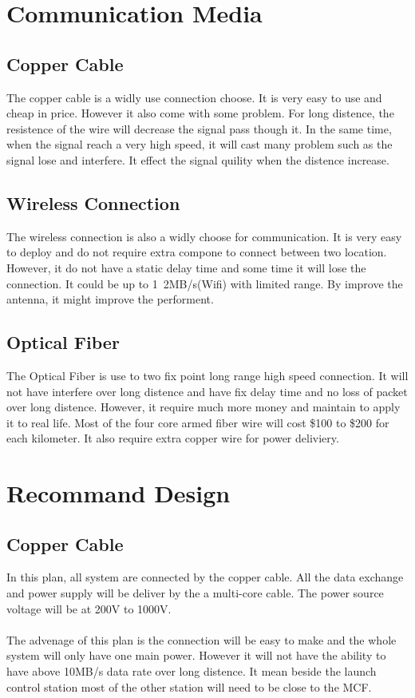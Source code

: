 \documentclass[12pt,article]{memoir}
\begin{document}
\chapter{Communication Media}
\section{Copper Cable}
The copper cable is a widly use connection choose. It is very easy to use and cheap in price. However it also come with some problem. For long distence, the resistence of the wire will decrease the signal pass though it. In the same time, when the signal reach a very high speed, it will cast many problem such as the signal lose and interfere. It effect the signal quility when the distence increase.
\section{Wireless Connection}
The wireless connection is also a widly choose for communication. It is very easy to deploy and do not require extra compone to connect between two location. However, it do not have a static delay time and some time it will lose the connection. It could be up to 1~2MB/s(Wifi) with limited range. By improve the antenna, it might improve the performent.
\section{Optical Fiber}
The Optical Fiber is use to two fix point long range high speed connection. It will not have interfere over long distence and have fix delay time and no loss of packet over long distence. However, it require much more money and maintain to apply it to real life. Most of the four core armed fiber wire will cost \$100 to \$200 for each kilometer. It also require extra copper wire for power deliviery.
\newpage
\chapter{Recommand Design}
\section{Copper Cable}
In this plan, all system are connected by the copper cable. All the data exchange and power supply will be deliver by the a multi-core cable. The power source voltage will be at 200V to 1000V.\\\\
The advenage of this plan is the connection will be easy to make and the whole system will only have one main power. However it will not have the ability to have above 10MB/s data rate over long distence. It mean beside the launch control station most of the other station will need to be close to the MCF.
\end{document}
